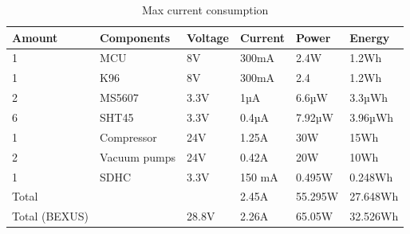 \documentclass[ %
  a4paper, %
  11pt, %
  openany, %
  parskip, %
  toc=totoc, %
  listof=totoc, %
  bibliography=totoc %
]{scrreprt} %
\newcommand{\micro}{\textmu} %
\providecommand{\DIFaddbeginFL}{} %
\providecommand{\DIFaddendFL}{} %
\providecommand{\DIFdelbeginFL}{} %
\providecommand{\DIFdelendFL}{} %
\providecommand{\DIFscaledelfig}{0.5}
\newlength{\DIFdelgraphicswidth} %
\newlength{\DIFdelgraphicsheight} %
\providecommand{\DIFaddincludegraphics}[2][]{{\color{blue}\fbox{\DIFOincludegraphics[#1]{#2}}}} %
\providecommand{\DIFdelincludegraphics}[2][]{%
\sbox{\DIFdelgraphicsbox}{\DIFOincludegraphics[#1]{#2}}%
\settoboxwidth{\DIFdelgraphicswidth}{\DIFdelgraphicsbox} %
\settoboxtotalheight{\DIFdelgraphicsheight}{\DIFdelgraphicsbox} %
\scalebox{\DIFscaledelfig}{%
\parbox[b]{\DIFdelgraphicswidth}{\usebox{\DIFdelgraphicsbox}\\[-\baselineskip] \rule{\DIFdelgraphicswidth}{0em}}\llap{\resizebox{\DIFdelgraphicswidth}{\DIFdelgraphicsheight}{%
\setlength{\unitlength}{\DIFdelgraphicswidth}%
\begin{picture}(1,1)%
\thicklines\linethickness{2pt} %
{\color[rgb]{1,0,0}\put(0,0){\framebox(1,1){}}}%
{\color[rgb]{1,0,0}\put(0,0){\line( 1,1){1}}}%
{\color[rgb]{1,0,0}\put(0,1){\line(1,-1){1}}}%
\end{picture}%
}\hspace*{3pt}}} %
} %
\DeclareRobustCommand{\DIFaddbeginFL}{\DIFOaddbeginFL \let\includegraphics\DIFaddincludegraphics} %
\DeclareRobustCommand{\DIFaddendFL}{\DIFOaddendFL \let\includegraphics\DIFOincludegraphics} %
\DeclareRobustCommand{\DIFdelbeginFL}{\DIFOdelbeginFL \let\includegraphics\DIFdelincludegraphics} %
\DeclareRobustCommand{\DIFdelendFL}{\DIFOaddendFL \let\includegraphics\DIFOincludegraphics} %
\begin{document}
\begin{table}[H]
\centering
\caption{Max current consumption}
\label{tab:current_consumption}
\DIFdelbeginFL %
\DIFdelendFL \DIFaddbeginFL \begin{tabular}{llllll}
\toprule
\textbf{Amount} & \textbf{Components}& \textbf{Voltage} & \textbf{Current} &\textbf{Power} &\textbf{Energy}\\
\midrule
1 & MCU & 8V & 300mA & 2.4W & 1.2Wh\\
1 & K96 & 8V & 300mA & 2.4 & 1.2Wh \\
2 & MS5607 & 3.3V& 1µA & 6.6µW & 3.3µWh \\
6 & SHT45 & 3.3V & 0.4µA & 7.92µW & 3.96µWh \\
1 & Compressor & 24V & 1.25A & 30W & 15Wh \\
2 & Vacuum pumps & 24V & 0.42A & 20W & 10Wh\\
1 & SDHC & 3.3V & 150 mA & 0.495W & 0.248Wh \\
\midrule
Total &&& 2.45A & 55.295W & 27.648Wh\\
Total (BEXUS) &&28.8V& 2.26A & 65.05W & 32.526Wh \\
\bottomrule
\end{tabular}
\DIFaddendFL \end{table}
\end{document}
